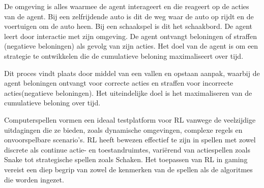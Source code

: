 \documentclass[a4paper,12pt]{report}
\begin{document}
\noindent
\begin{minipage}[t]{0.65\textwidth}
    \vspace{-6.5\baselineskip}
    De omgeving is alles waarmee de agent interageert en die reageert op de acties van
    de agent. Bij een zelfrijdende auto is dit de weg waar de auto op rijdt en de
    voertuigen om de auto heen. Bij een schaakspel is dit het schaakbord. De agent
    leert door interactie met zijn omgeving. De agent ontvangt beloningen of
    straffen (negatieve beloningen) als gevolg van zijn acties. Het doel van de
    agent is om een strategie te ontwikkelen die de cumulatieve beloning
    maximaliseert over tijd.
\end{minipage}
\hfill %
\begin{minipage}[t]{0.3\textwidth} %
    \centering
    \label{fig:rl_model}
\end{minipage}

Dit proces vindt plaats door middel van een vallen en opstaan aanpak, waarbij
de agent beloningen ontvangt voor correcte acties en straffen voor incorrecte
acties(negatieve beloningen). Het uiteindelijke doel is het maximaliseren van
de cumulatieve beloning over tijd.

Computerspellen vormen een ideaal testplatform voor RL vanwege de veelzijdige
uitdagingen die ze bieden, zoals dynamische omgevingen, complexe regels en
onvoorspelbare scenario’s. RL heeft bewezen effectief te zijn in spellen met
zowel discrete als continue actie- en toestandruimtes, variërend van
actiespellen zoals Snake tot strategische spellen zoals Schaken. Het toepassen
van RL in gaming vereist een diep begrip van zowel de kenmerken van de spellen
als de algoritmes die worden ingezet.
\end{document}
